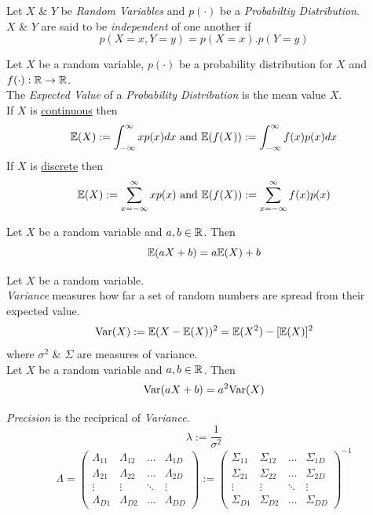 \documentclass[11pt,a4paper]{article}
\begin{document}
Let $X$ \& $Y$ be \textit{Random Variables} and $p(\cdot)$ be a \textit{Probabiltiy Distribution}.\\
$X$ \& $Y$ are said to be \textit{independent} of one another if
$$p(X=x,Y=y)=p(X=x).p(Y=y)$$

Let $X$ be a random variable, $p(\cdot)$ be a probability distribution for $X$ and $f(\cdot):\mathbb{R}\to\mathbb{R}$.\\
The \textit{Expected Value} of a \textit{Probability Distribution} is the mean value $X$.\\
If $X$ is \underline{continuous} then
$$\mathbb{E}(X):=\int_{-\infty}^\infty xp(x)dx\text{ and }\mathbb{E}(f(X)):=\int_{-\infty}^\infty f(x)p(x)dx$$
If $X$ is \underline{discrete} then
$$\mathbb{E}(X):=\sum_{x=-\infty}^\infty xp(x)\text{ and }\mathbb{E}(f(X)):=\sum_{x=-\infty}^\infty f(x)p(x)$$

Let $X$ be a random variable and $a,b\in\mathbb{R}$. Then
$$\mathbb{E}(aX+b)=a\mathbb{E}(X)+b$$

Let $X$ be a random variable.\\
\textit{Variance} measures how far a set of random numbers are spread from their expected value.
$$\mathrm{Var}(X):=\mathbb{E}(X-\mathbb{E}(X))^2=\mathbb{E}(X^2)-[\mathbb{E}(X)]^2$$
where $\sigma^2$ \& $\Sigma$ are measures of variance.\\

Let $X$ be a random variable and $a,b\in\mathbb{R}$. Then
$$\mathrm{Var}(aX+b)=a^2\mathrm{Var}(X)$$

\textit{Precision} is the reciprical of \textit{Variance}.\\
$$\lambda:=\frac{1}{\sigma^2}$$
$$\Lambda=\begin{pmatrix}\Lambda_{11}&\Lambda_{12}&\dots&\Lambda_{1D}\\\Lambda_{21}&\Lambda_{22}&\dots&\Lambda_{2D}\\\vdots&\vdots&\ddots&\vdots\\\Lambda_{D1}&\Lambda_{D2}&\dots&\Lambda_{DD}\end{pmatrix}:=\begin{pmatrix}\Sigma_{11}&\Sigma_{12}&\dots&\Sigma_{1D}\\\Sigma_{21}&\Sigma_{22}&\dots&\Sigma_{2D}\\\vdots&\vdots&\ddots&\vdots\\\Sigma_{D1}&\Sigma_{D2}&\dots&\Sigma_{DD}\end{pmatrix}^{-1}$$
\end{document}
